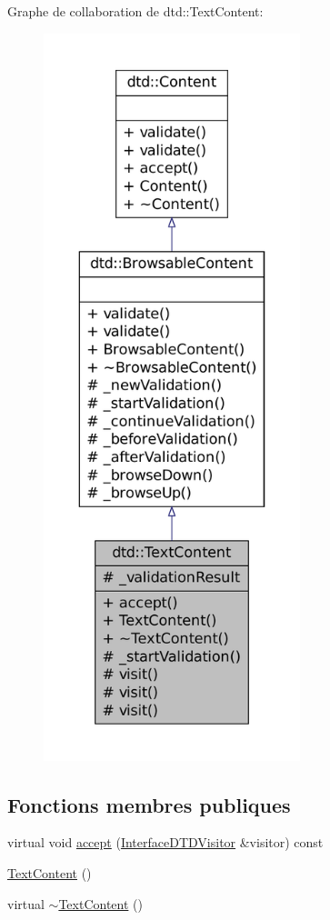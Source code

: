 Graphe de collaboration de dtd::TextContent:\nopagebreak
\begin{figure}[H]
\begin{center}
\leavevmode
\includegraphics[height=600pt]{classdtd_1_1_text_content__coll__graph}
\end{center}
\end{figure}
\subsection*{Fonctions membres publiques}
\begin{DoxyCompactItemize}
\item 
virtual void \hyperlink{classdtd_1_1_text_content_a5193fbafe92665d975b886a6ca18ac4f}{accept} (\hyperlink{classdtd_1_1_interface_d_t_d_visitor}{InterfaceDTDVisitor} \&visitor) const 
\item 
\hyperlink{classdtd_1_1_text_content_a20db379cdb659e237de428f1ae0c4a16}{TextContent} ()
\item 
virtual \hyperlink{classdtd_1_1_text_content_aec396d8d7dcf1808ee05291f3cc77104}{$\sim$TextContent} ()
\end{DoxyCompactItemize}
